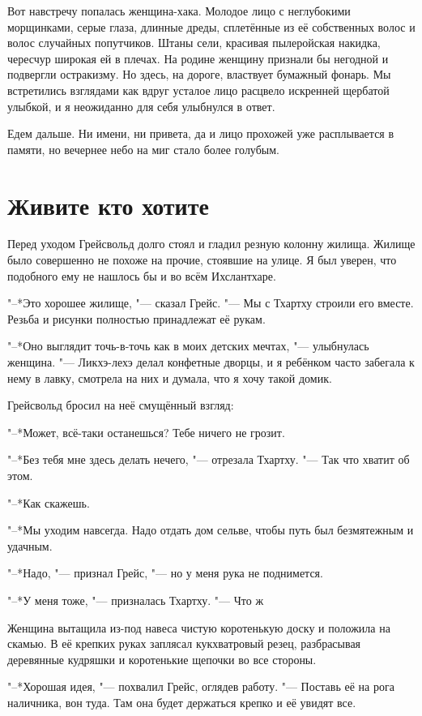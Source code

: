 \documentclass[a4paper,10pt,fleqn]{book}
\newcommand{\ldotst}{\so{...}\xspace}
\begin{document}
Вот навстречу попалась женщина-хака.
Молодое лицо с неглубокими морщинками, серые глаза, длинные дреды, сплетённые из её собственных волос и волос случайных попутчиков.
Штаны сели, красивая пылеройская накидка, чересчур широкая ей в плечах.
На родине женщину признали бы негодной и подвергли остракизму.
Но здесь, на дороге, властвует бумажный фонарь.
Мы встретились взглядами\ldotst как вдруг усталое лицо расцвело искренней щербатой улыбкой, и я неожиданно для себя улыбнулся в ответ.

Едем дальше.
Ни имени, ни привета, да и лицо прохожей уже расплывается в памяти, но вечернее небо на миг стало более голубым.

\section{Живите кто хотите}

Перед уходом Грейсвольд долго стоял и гладил резную колонну жилища.
Жилище было совершенно не похоже на прочие, стоявшие на улице.
Я был уверен, что подобного ему не нашлось бы и во всём Ихслантхаре.

"--*Это хорошее жилище, "--- сказал Грейс.
"--- Мы с Тхартху строили его вместе.
Резьба и рисунки полностью принадлежат её рукам.

"--*Оно выглядит точь-в-точь как в моих детских мечтах, "--- улыбнулась женщина.
"--- Ликхэ-лехэ делал конфетные дворцы, и я ребёнком часто забегала к нему в лавку, смотрела на них и думала, что я хочу такой домик.

Грейсвольд бросил на неё смущённый взгляд:

"--*Может, всё-таки останешься?
Тебе ничего не грозит.

"--*Без тебя мне здесь делать нечего, "--- отрезала Тхартху.
"--- Так что хватит об этом.

"--*Как скажешь.

"--*Мы уходим навсегда.
Надо отдать дом сельве, чтобы путь был безмятежным и удачным.

"--*Надо, "--- признал Грейс, "--- но у меня рука не поднимется.

"--*У меня тоже, "--- призналась Тхартху.
"--- Что ж\ldotst

Женщина вытащила из-под навеса чистую коротенькую доску и положила на скамью.
В её крепких руках заплясал кукхватровый резец, разбрасывая деревянные кудряшки и коротенькие щепочки во все стороны.

"--*Хорошая идея, "--- похвалил Грейс, оглядев работу.
"--- Поставь её на рога наличника, вон туда.
Там она будет держаться крепко и её увидят все.
\end{document}
